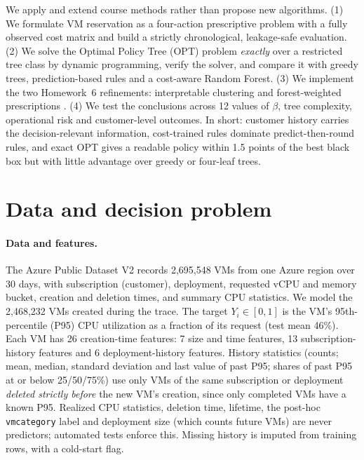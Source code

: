 \documentclass[10pt]{article}
\begin{document}
We apply and extend course methods rather than propose new algorithms. (1) We formulate VM reservation as a four-action prescriptive problem with a fully observed cost matrix and build a strictly chronological, leakage-safe evaluation. (2) We solve the Optimal Policy Tree (OPT) problem \citep{amram2022opt} \emph{exactly} over a restricted tree class by dynamic programming, verify the solver, and compare it with greedy trees, prediction-based rules and a cost-aware Random Forest. (3) We implement the two Homework~6 refinements: interpretable clustering \citep[Ch.~20]{bertsimas2019mlopt} and forest-weighted prescriptions \citep[Ch.~13]{bertsimas2019mlopt}. (4) We test the conclusions across 12 values of $\beta$, tree complexity, operational risk and customer-level outcomes. In short: customer history carries the decision-relevant information, cost-trained rules dominate predict-then-round rules, and exact OPT gives a readable policy within 1.5 points of the best black box but with little advantage over greedy or four-leaf trees.

\section{Data and decision problem}
\label{sec:data}

\paragraph{Data and features.} The Azure Public Dataset V2 \citep{azuredataset} records 2,695,548 VMs from one Azure region over 30 days, with subscription (customer), deployment, requested vCPU and memory bucket, creation and deletion times, and summary CPU statistics. We model the 2,468,232 VMs created during the trace. The target $Y_i\in[0,1]$ is the VM's 95th-percentile (P95) CPU utilization as a fraction of its request (test mean 46\%). Each VM has 26 creation-time features: 7 size and time features, 13 subscription-history features and 6 deployment-history features. History statistics (counts; mean, median, standard deviation and last value of past P95; shares of past P95 at or below 25/50/75\%) use only VMs of the same subscription or deployment \emph{deleted strictly before} the new VM's creation, since only completed VMs have a known P95. Realized CPU statistics, deletion time, lifetime, the post-hoc \texttt{vmcategory} label and deployment size (which counts future VMs) are never predictors; automated tests enforce this. Missing history is imputed from training rows, with a cold-start flag.
\end{document}
